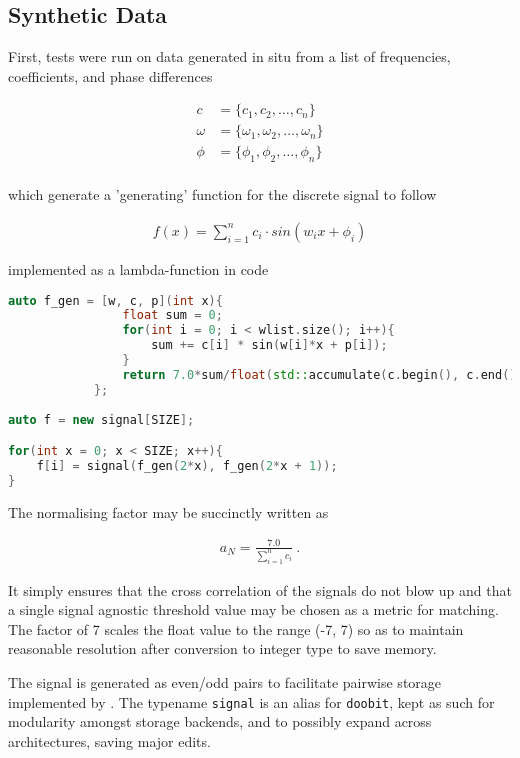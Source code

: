 \subsection{Synthetic Data}

First, tests were run on data generated in situ from a list of frequencies, coefficients, and phase differences

\begin{align*}
    c &= \{c_1, c_2, \ldots, c_n\}\\
    \omega &= \{\omega_1, \omega_2, \ldots, \omega_n\}\\
    \phi &= \{\phi_1, \phi_2, \ldots, \phi_n\}\\
\end{align*}

which generate a 'generating' function for the discrete signal to follow

\begin{align*}
    f(x) = \sum_{i = 1}^{n} c_i \cdot sin(w_i x + \phi_i)
\end{align*}

implemented as a lambda-function in code 

\begin{lstlisting}[language=C++]
auto f_gen = [w, c, p](int x){
                float sum = 0;
                for(int i = 0; i < wlist.size(); i++){
                    sum += c[i] * sin(w[i]*x + p[i]);
                }
                return 7.0*sum/float(std::accumulate(c.begin(), c.end(), 0));
            };
            
auto f = new signal[SIZE];

for(int x = 0; x < SIZE; x++){
    f[i] = signal(f_gen(2*x), f_gen(2*x + 1));
}
\end{lstlisting}

The normalising factor may be succinctly written as 

\begin{align*}
    a_N = \frac{7.0}{\sum_{i = 1}^{n}c_i}~.
\end{align*}

It simply ensures that the cross correlation of the signals do not blow up and
that a single signal agnostic threshold value may be chosen as a metric for
matching. The factor of 7 scales the float value to the range (-7, 7) so as to
maintain reasonable resolution after conversion to integer type to save memory.

The signal is generated as even/odd pairs to facilitate pairwise storage
implemented by . The typename \texttt{signal} is an alias
for \texttt{doobit}, kept as such for modularity amongst storage backends, and
to possibly expand across architectures, saving major edits.

